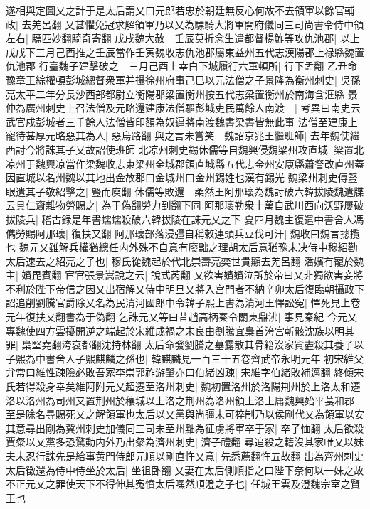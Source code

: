 遂相與定圖乂之計于是太后謂乂曰元郎若忠於朝廷無反心何故不去領軍以餘官輔政|{
	去羌呂翻}
乂甚懼免冠求解領軍乃以乂為驃騎大將軍開府儀同三司尚書令侍中領左右|{
	驃匹妙翻騎奇寄翻}
戊戌魏大赦　壬辰莫折念生遣都督楊鮓等攻仇池郡|{
	以上戊戌下三月己酉推之壬辰當作壬寅魏收志仇池郡屬東益州五代志漢陽郡上禄縣魏置仇池郡}
行臺魏子建擊破之　三月己酉上幸白下城履行六軍頓所|{
	行下孟翻}
乙丑命豫章王綜權頓彭城總督衆軍并攝徐州府事己巳以元法僧之子景隆為衡州刺史|{
	吳孫亮太平二年分長沙西部都尉立衡陽郡梁置衡州按五代志梁置衡州於南海含洭縣}
景仲為廣州刺史上召法僧及元略還建康法僧驅彭城吏民萬餘人南渡　|{
	考異曰南史云武官戍彭城者三千餘人法僧皆印額為奴逼將南渡魏書梁書皆無此事}
法僧至建康上寵待甚厚元略惡其為人|{
	惡烏路翻}
與之言未嘗笑　魏詔京兆王繼班師|{
	去年魏使繼西討今將誅其子乂故詔使班師}
北凉州刺史錫休儒等自魏興侵魏梁州攻直城|{
	梁置北凉州于魏興凉當作梁魏收志東梁州金城郡領直城縣五代志金州安康縣蕭詧改直州蓋因直城以名州魏以其地出金故郡曰金城州曰金州錫姓也漢有錫光}
魏梁州刺史傅豎眼遣其子敬紹擊之|{
	豎而庾翻}
休儒等敗還　柔然王阿那瓌為魏討破六韓拔陵魏遣牒云具仁齎雜物勞賜之|{
	為于偽翻勞力到翻下同}
阿那瓌勒衆十萬自武川西向沃野屢破拔陵兵|{
	稽古録是年書蠕蠕殺破六韓拔陵在誅元乂之下}
夏四月魏主復遣中書舍人馮儁勞賜阿那瓌|{
	復扶又翻}
阿那瓌部落浸彊自稱敕連頭兵豆伐可汗|{
	魏收曰魏言摠攬也}
魏元乂雖解兵權猶總任内外殊不自意有廢黜之理胡太后意猶豫未决侍中穆紹勸太后速去之紹亮之子也|{
	穆氏從魏起於代北崇夀亮奕世貴顯去羌呂翻}
潘嬪有寵於魏主|{
	嬪毘賓翻}
宦官張景嵩說之云|{
	說式芮翻}
乂欲害嬪嬪泣訴於帝曰乂非獨欲害妾將不利於陛下帝信之因乂出宿解乂侍中明旦乂將入宫門者不納辛卯太后復臨朝攝政下詔追削劉騰官爵除乂名為民清河國郎中令韓子熙上書為清河王懌訟寃|{
	懌死見上卷元年復扶又翻書為于偽翻}
乞誅元乂等曰昔趙高柄秦令關東鼎沸|{
	事見秦紀}
今元乂專魏使四方雲擾開逆之端起於宋維成禍之末良由劉騰宜梟首洿宫斬骸沈族以明其罪|{
	梟堅堯翻洿哀都翻沈持林翻}
太后命發劉騰之墓露散其骨籍沒家貲盡殺其養子以子熙為中書舍人子熙麒麟之孫也|{
	韓麒麟見一百三十五卷齊武帝永明元年}
初宋維父弁常曰維性疎險必敗吾家李崇郭祚游肇亦曰伯緒凶疎|{
	宋維字伯緒敗補邁翻}
終傾宋氏若得殺身幸矣維阿附元乂超遷至洛州刺史|{
	魏初置洛州於洛陽荆州於上洛太和遷洛以洛州為司州又置荆州於穰城以上洛之荆州為洛州領上洛上庸魏興始平萇和郡}
至是除名尋賜死乂之解領軍也太后以乂黨與尚彊未可猝制乃以侯剛代乂為領軍以安其意尋出剛為冀州刺史加儀同三司未至州黜為征虜將軍卒于家|{
	卒子恤翻}
太后欲殺賈粲以乂黨多恐驚動内外乃出粲為濟州刺史|{
	濟子禮翻}
尋追殺之籍沒其家唯乂以妹夫未忍行誅先是給事黄門侍郎元順以剛直忤乂意|{
	先悉薦翻忤五故翻}
出為齊州刺史太后徵還為侍中侍坐於太后|{
	坐徂卧翻}
乂妻在太后側順指之曰陛下奈何以一妹之故不正元乂之罪使天下不得伸其寃憤太后嘿然順澄之子也|{
	任城王雲及澄魏宗室之賢王也}
